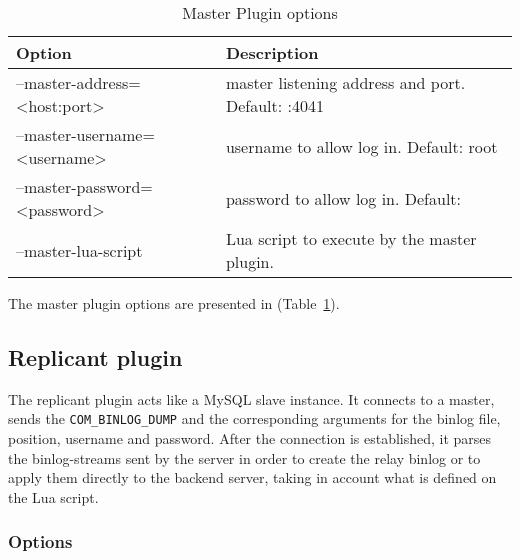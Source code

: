 \begin{table}[h!]
\centering
    \begin{tabular}{ | l | l |}
    \hline
    Option & Description \\ \hline
	--master-address=<host:port> & master listening address and port. Default: :4041 \\ \hline
    --master-username=<username> & username to allow log in. Default: root \\ \hline
	--master-password=<password>  & password to allow log in. Default: \\ \hline
	--master-lua-script & Lua script to execute by the master plugin. \\ \hline
    \end{tabular}

\caption{Master Plugin options}
\label{tab:master_plugin_options}
\end{table}

The master plugin options are presented in (Table~\ref{tab:master_plugin_options}).

\subsection{Replicant plugin}

The replicant plugin acts like a MySQL slave instance. It connects to a master, sends the \texttt{COM\_BINLOG\_DUMP} and the corresponding arguments for the binlog file, position, username and password. After the connection is established, it parses the binlog-streams sent by the server in order to create the relay binlog or to apply them directly to the backend server, taking in account what is defined on the Lua script. 

\subsubsection{Options}

